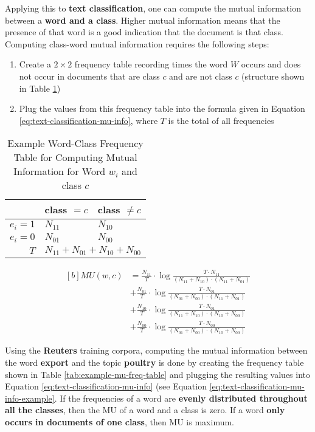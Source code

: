\documentclass{article}
\begin{document}
Applying this to \textbf{text classification}, one can compute the mutual information between a \textbf{word and a class}. Higher mutual information means that the presence of that word is a good indication that the document is that class. Computing class-word mutual information requires the following steps:
\begin{enumerate}
	\item Create a $2 \times 2$ frequency table recording times the word $W$ occurs and does not occur in documents that are class $c$ and are not class $c$ (structure shown in Table \ref{tab:mu-freq-table})
	\item Plug the values from this frequency table into the formula given in Equation \ref{eq:text-classification-mu-info}, where $T$ is the total of all frequencies
\end{enumerate}

\begin{table}[H]
	\centering
	\begin{tabular}{|r|l|l|}
		\hline
		& class $=c$ & class $\neq c$ \\
		\hline
		$e_i = 1$ & $N_{11}$ & $N_{10}$ \\
		$e_i = 0$ & $N_{01}$ & $N_{00}$ \\
		\hline
		$T$ & \multicolumn{2}{l|}{$N_{11} + N_{01} + N_{10} + N_{00}$}  \\
		\hline
	\end{tabular}
	\caption{Example Word-Class Frequency Table for Computing Mutual Information for Word $w_i$ and class $c$}
	\label{tab:mu-freq-table}
\end{table}

\begin{equation}
\begin{aligned}[b]
	MU(w, c) &= \frac{N_{11}}{T} \cdot \log \frac{T \cdot N_{11} }{(N_{11} + N_{10}) \cdot (N_{11} + N_{01})} \\
	&+ \frac{N_{01}}{T} \cdot \log \frac{T \cdot N_{01} }{(N_{01} + N_{00}) \cdot (N_{11} + N_{01})} \\
	&+ \frac{N_{10}}{T} \cdot \log \frac{T \cdot N_{01} }{(N_{11} + N_{10}) \cdot (N_{10} + N_{00})} \\
	&+ \frac{N_{00}}{T} \cdot \log \frac{T \cdot N_{00} }{(N_{01} + N_{00}) \cdot (N_{10} + N_{00})}
	\label{eq:text-classification-mu-info}
\end{aligned}
\end{equation}

Using the \textbf{Reuters} training corpora, computing the mutual information between the word \textbf{export} and the topic \textbf{poultry} is done by creating the frequency table shown in Table \ref{tab:example-mu-freq-table} and plugging the resulting values into Equation \ref{eq:text-classification-mu-info} (see Equation \ref{eq:text-classification-mu-info-example}. If the frequencies of a word are \textbf{evenly distributed throughout all the classes}, then the MU of a word and a class is zero. If a word \textbf{only occurs in documents of one class}, then MU is maximum.
\end{document}
